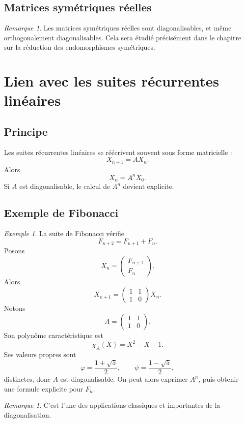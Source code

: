 \documentclass[11pt,a4paper]{article}
\theoremstyle{remark}
\newtheorem{remarque}[definition]{Remarque}
\newtheorem{exemple}[definition]{Exemple}
\begin{document}
\subsection{Matrices symétriques réelles}

\begin{remarque}
Les matrices symétriques réelles sont diagonalisables, et même orthogonalement diagonalisables. Cela sera étudié précisément dans le chapitre sur la réduction des endomorphismes symétriques.
\end{remarque}

\section{Lien avec les suites récurrentes linéaires}

\subsection{Principe}

Les suites récurrentes linéaires se réécrivent souvent sous forme matricielle :
\[
X_{n+1}=AX_n.
\]
Alors
\[
X_n=A^nX_0.
\]
Si \(A\) est diagonalisable, le calcul de \(A^n\) devient explicite.

\subsection{Exemple de Fibonacci}

\begin{exemple}
La suite de Fibonacci vérifie
\[
F_{n+2}=F_{n+1}+F_n.
\]
Posons
\[
X_n=
\begin{pmatrix}
F_{n+1}\\
F_n
\end{pmatrix}.
\]
Alors
\[
X_{n+1}=
\begin{pmatrix}
1 & 1\\
1 & 0
\end{pmatrix}
X_n.
\]
Notons
\[
A=
\begin{pmatrix}
1 & 1\\
1 & 0
\end{pmatrix}.
\]
Son polynôme caractéristique est
\[
\chi_A(X)=X^2-X-1.
\]
Ses valeurs propres sont
\[
\varphi=\frac{1+\sqrt5}{2},
\qquad
\psi=\frac{1-\sqrt5}{2},
\]
distinctes, donc \(A\) est diagonalisable. On peut alors exprimer \(A^n\), puis obtenir une formule explicite pour \(F_n\).
\end{exemple}

\begin{remarque}
C’est l’une des applications classiques et importantes de la diagonalisation.
\end{remarque}
\end{document}
